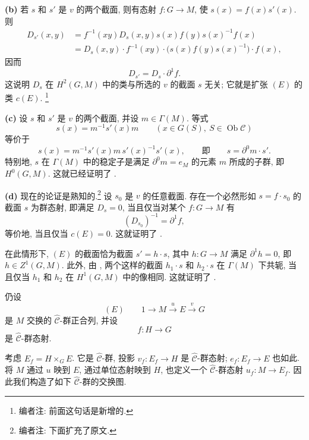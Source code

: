\smallskip
\noindent\textbf{(b)}
若 \(s\) 和 \(s'\) 是 \(v\) 的两个截面, 则有态射
\(f:G\to M\), 使 \(s(x)=f(x)s'(x)\). 则
\[
\begin{aligned}
 D_{s'}(x,y)
 &=f^{-1}(xy)D_s(x,y)s(x)f(y)s(x)^{-1}f(x)\\
 &=D_s(x,y)\cdot f^{-1}(xy)
   \cdot\bigl(s(x)f(y)s(x)^{-1}\bigr)\cdot f(x),
\end{aligned}
\]
因而
\[
 D_{s'}=D_s\cdot\partial^1f.
\]
这说明 \(D_s\) 在 \(H^2(G,M)\) 中的类与所选的 \(v\)
的截面 \(s\) 无关; 它就是扩张 \((E)\) 的类 \(c(E)\).
\footnote{编者注: 前面这句话是新增的.}

\smallskip
\noindent\textbf{(c)}
设 \(s\) 和 \(s'\) 是 \(v\) 的两个截面, 并设
\(m\in\Gamma(M)\). 等式
\[
 s(x)=m^{-1}s'(x)m
 \qquad(x\in G(S),\ S\in\operatorname{Ob}\mathscr C)
\]
等价于
\[
 s(x)=m^{-1}s'(x)m\,s'(x)^{-1}s'(x),
 \qquad\text{即}\qquad
 s=\partial^0m\cdot s'.
\]
特别地, \(s\) 在 \(\Gamma(M)\) 中的稳定子是满足
\(\partial^0m=e_M\) 的元素 \(m\) 所成的子群, 即 \(H^0(G,M)\).
这就已经证明了 .

\smallskip
\noindent\textbf{(d)}
现在的论证是熟知的.\footnote{编者注: 下面扩充了原文.}
设 \(s_0\) 是 \(v\) 的任意截面. 存在一个必然形如
\(s=f\cdot s_0\) 的截面 \(s\) 为群态射, 即满足 \(D_s=0\),
当且仅当对某个 \(f:G\to M\) 有
\[
 (D_{s_0})^{-1}=\partial^1f,
\]
等价地, 当且仅当 \(c(E)=0\).
这就证明了 .

在此情形下, \((E)\) 的截面恰为截面
\(s'=h\cdot s\), 其中 \(h:G\to M\) 满足
\(\partial^1h=0\), 即 \(h\in Z^1(G,M)\).
此外, 由 ,
两个这样的截面 \(h_1\cdot s\) 和 \(h_2\cdot s\)
在 \(\Gamma(M)\) 下共轭, 当且仅当 \(h_1\) 和 \(h_2\)
在 \(H^1(G,M)\) 中的像相同. 这就证明了
.

仍设
\[
 (E)\qquad
 1\longrightarrow M\xrightarrow{u}E\xrightarrow{v}G
\]
是 \(M\) 交换的 \(\widehat{\mathscr C}\)-群正合列, 并设
\[
 f:H\longrightarrow G
\]
是 \(\widehat{\mathscr C}\)-群态射.

考虑 \(E_f=H\times_G E\). 它是
\(\widehat{\mathscr C}\)-群, 投影
\(v_f:E_f\to H\) 是 \(\widehat{\mathscr C}\)-群态射;
\(e_f:E_f\to E\) 也如此. 将 \(M\) 通过 \(u\) 映到 \(E\),
通过单位态射映到 \(H\), 也定义一个
\(\widehat{\mathscr C}\)-群态射 \(u_f:M\to E_f\).
因此我们构造了如下 \(\widehat{\mathscr C}\)-群的交换图.

